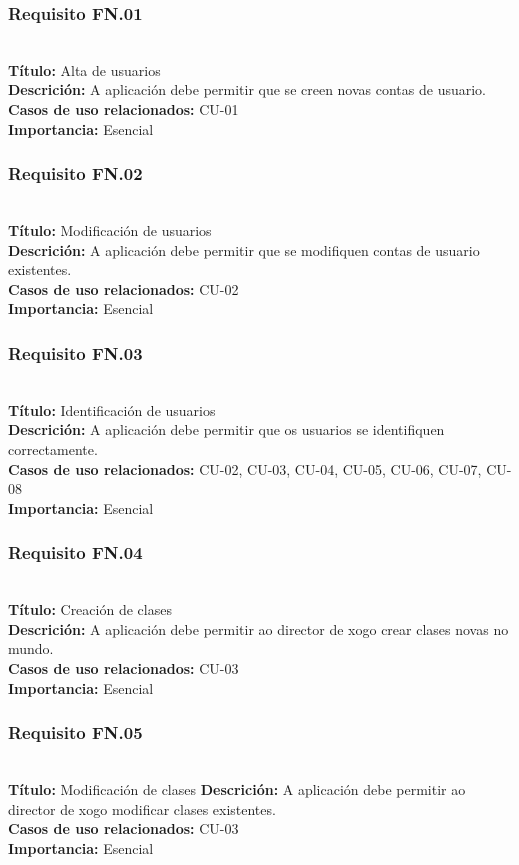 \subsubsection{Requisito FN.01}~\\
{\bf Título:} Alta de usuarios\\
{\bf Descrición:} A aplicación debe permitir que se creen novas contas de usuario.\\
{\bf Casos de uso relacionados:} CU-01\\
{\bf Importancia:} Esencial

\subsubsection{Requisito FN.02}~\\
{\bf Título:} Modificación de usuarios\\
{\bf Descrición:} A aplicación debe permitir que se modifiquen contas de usuario
existentes.\\
{\bf Casos de uso relacionados:} CU-02\\
{\bf Importancia:} Esencial

\subsubsection{Requisito FN.03}~\\
{\bf Título:} Identificación de usuarios\\
{\bf Descrición:} A aplicación debe permitir que os usuarios se identifiquen
correctamente.\\
{\bf Casos de uso relacionados:} CU-02, CU-03, CU-04, CU-05, CU-06, CU-07, CU-08\\
{\bf Importancia:} Esencial

\subsubsection{Requisito FN.04}~\\
{\bf Título:} Creación de clases\\
{\bf Descrición:} A aplicación debe permitir ao director de xogo crear clases
novas no mundo.\\
{\bf Casos de uso relacionados:} CU-03\\
{\bf Importancia:} Esencial

\subsubsection{Requisito FN.05}~\\
{\bf Título:} Modificación de clases
{\bf Descrición:} A aplicación debe permitir ao director de xogo modificar
clases existentes.\\
{\bf Casos de uso relacionados:} CU-03\\
{\bf Importancia:} Esencial


